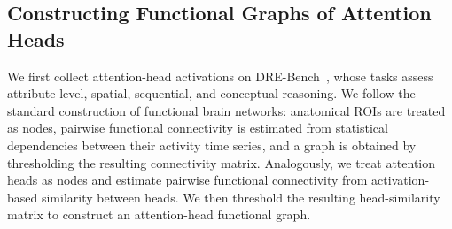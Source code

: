 
\subsection{Constructing Functional Graphs of Attention Heads}
\label{sec:constructing-head}
% 






We first collect attention-head activations on DRE-Bench~\cite{yang2025truly}, whose tasks assess attribute-level, spatial, sequential, and conceptual reasoning. We follow the standard construction of functional brain networks: anatomical ROIs are treated as nodes, pairwise functional connectivity is estimated from statistical dependencies between their activity time series, and a graph is obtained by thresholding the resulting connectivity matrix. Analogously, we treat attention heads as nodes and estimate pairwise functional connectivity from activation-based similarity between heads. We then threshold the resulting head-similarity matrix to construct an attention-head functional graph.


